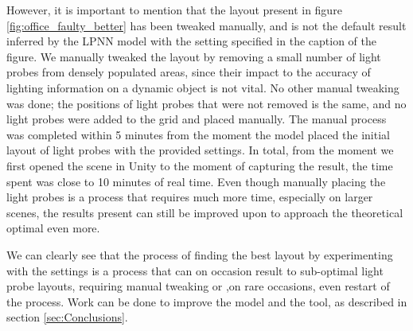 However, it is important to mention that the layout present in figure \ref{fig:office_faulty_better} has been tweaked manually, and is not the default result inferred by the LPNN model with the setting specified in the caption of the figure. We manually tweaked the layout by removing a small number of light probes from densely populated areas, since their impact to the accuracy of lighting information on a dynamic object is not vital. No other manual tweaking was done; the positions of light probes that were not removed is the same, and no light probes were added to the grid and placed manually. The manual process was completed within 5 minutes from the moment the model placed the initial layout of light probes with the provided settings. In total, from the moment we first opened the scene in Unity to the moment of capturing the result, the time spent was close to 10 minutes of real time. Even though manually placing the light probes is a process that requires much more time, especially on larger scenes, the results present can still be improved upon to approach the theoretical optimal even more.

We can clearly see that the process of finding the best layout by experimenting with the settings is a process that can on occasion result to sub-optimal light probe layouts, requiring manual tweaking or ,on rare occasions, even restart of the process. Work can be done to improve the model and the tool, as described in section \ref{sec:Conclusions}.